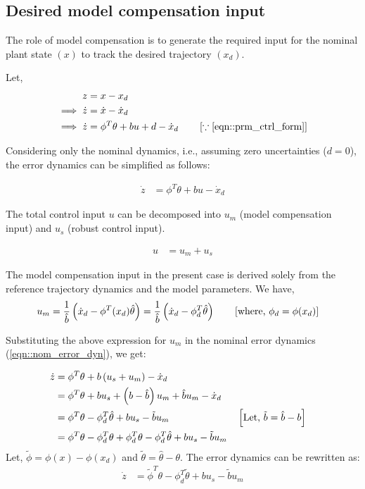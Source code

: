 \subsection{Desired model compensation input}
The role of model compensation is to generate the required input for the
nominal plant state $(x)$ to track the desired trajectory $(x_d)$.

Let,
\begin{align}
    z &= x - x_d\\
    \implies \dot z &= \dot x - \dot x_d\\
    \implies \dot z &= \phi^T \theta +  bu + d - \dot x_d \qquad \left[ \because \ref{eqn::prm_ctrl_form} \right]
    \label{eqn::error_dyn}
\end{align}

Considering only the nominal dynamics, i.e., assuming zero uncertainties ($d = 0$), the error dynamics can be simplified as follows:

\begin{align}
    \dot z &= \phi^T \theta + bu - \dot x_d
    \label{eqn::nom_error_dyn}
\end{align}

The total control input $u$ can be decomposed into $u_m$ (model compensation input) and $u_s$ (robust control input).

\begin{align}
    u &= u_m + u_s
\end{align}

The model compensation input in the present case is derived solely from the
reference trajectory dynamics and the model parameters. We have,
\begin{align}
    u_m &= \frac{1}{\hat b} \left( \dot x_d - \phi^T(x_d) \hat \theta \right)
         = \frac{1}{\hat b} \left( \dot x_d - \phi^T_d \hat \theta \right)
         \qquad \left[ \text{where, } \phi_d  = \phi(x_d) \right]
\end{align}

Substituting the above expression for $u_m$ in the nominal error dynamics (\ref{eqn::nom_error_dyn}), we get:

\begin{align*}
    \dot z &= \phi^T \theta + b \left( u_s + u_m \right) - \dot x_d \\
    &= \phi^T \theta + bu_s + \left( b - \hat b \right) u_m  + \hat b u_m - \dot x_d \\
    &= \phi^T \theta - \phi^T_d \hat \theta + bu_s - \tilde b u_m
    &&\left[ \text{Let, } \tilde b = \hat b - b \right]\\
    &= \phi^T \theta - \phi^T_d \theta + \phi^T_d \theta - \phi^T_d \hat \theta + bu_s - \tilde b u_m\\
\end{align*}
Let, $\tilde \phi = \phi(x) - \phi(x_d)$ and $\tilde \theta = \hat \theta -
\theta$. The error dynamics can be rewritten as:
\begin{align}
    \dot z &= \tilde \phi^T \theta - \phi^T_d \tilde \theta + bu_s - \tilde b u_m \label{eqn::error_dyn_model_comp}
\end{align}

